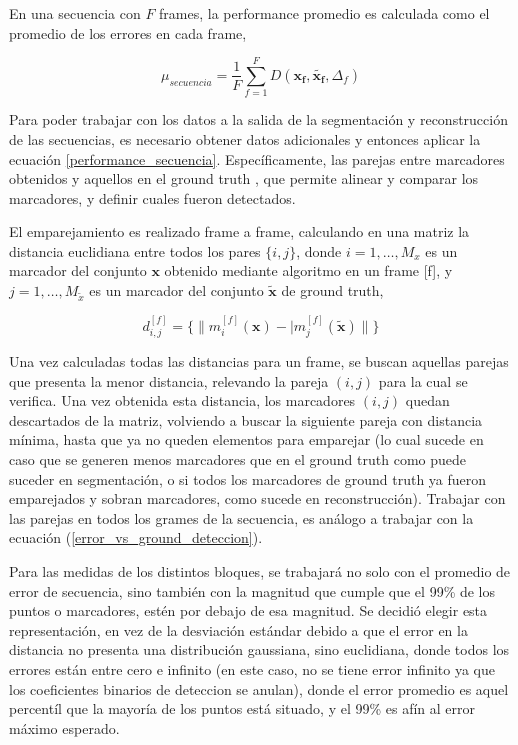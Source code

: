 En una secuencia con $F$ frames, la performance promedio es calculada como el promedio de los errores en cada frame,

\begin{equation}
\mu_{secuencia} = \frac{1}{F}\sum_{f=1}^{F} D(\boldsymbol{x_{f}},\boldsymbol{\tilde{x_{f}}},\Delta_{f})
\label{performance_secuencia}
\end{equation}

Para poder trabajar con los datos a la salida de la segmentación y reconstrucción de las secuencias, es necesario obtener datos adicionales y entonces aplicar la ecuación \ref{performance_secuencia}. Específicamente, las parejas entre marcadores obtenidos y aquellos en el ground truth , que permite alinear y comparar los marcadores, y definir cuales fueron detectados.

El emparejamiento es realizado frame a frame, calculando en una matriz la distancia euclidiana entre todos los pares $\{i,j\}$, donde $i=1,\ldots,M_{x}$ es un marcador del conjunto $\boldsymbol{x}$ obtenido mediante algoritmo en un frame [f], y $j=1,\ldots,M_{\tilde{x}}$ es un marcador del conjunto $\boldsymbol{\tilde{x}}$ de ground truth,

\begin{equation}
d_{i,j}^{[f]} = \{\|m_{i}^{[f]}(\boldsymbol{x})-|m_{j}^{[f]}(\boldsymbol{\tilde{x}})\|\}
\label{distancia_algoritmo_ground}
\end{equation}

Una vez calculadas todas las distancias para un frame, se buscan aquellas parejas que presenta la menor distancia, relevando la pareja $(i,j)$  para la cual se verifica. Una vez obtenida esta distancia, los marcadores $(i,j)$ quedan descartados de la matriz, volviendo a buscar la siguiente pareja con distancia mínima, hasta que ya no queden elementos para emparejar (lo cual sucede en caso que se generen menos marcadores que en el ground truth como puede suceder en segmentación, o si todos los marcadores de ground truth ya fueron emparejados y sobran marcadores, como sucede en reconstrucción). Trabajar con las parejas en todos los grames de la secuencia, es análogo a trabajar con la ecuación (\ref{error_vs_ground_deteccion}).

Para las medidas de los distintos bloques, se trabajará no solo con el promedio de error de secuencia, sino también con la magnitud que cumple que el 99\% de los puntos o marcadores, estén por debajo de esa magnitud. Se decidió elegir esta representación, en vez de la desviación estándar debido a que el error en la distancia no presenta una distribución gaussiana, sino euclidiana, donde todos los errores están entre cero e infinito (en este caso, no se tiene error infinito ya que los coeficientes binarios de deteccion se anulan), donde el error promedio es aquel percentíl que la mayoría de los puntos está situado, y el 99\% es afín al error máximo esperado.

